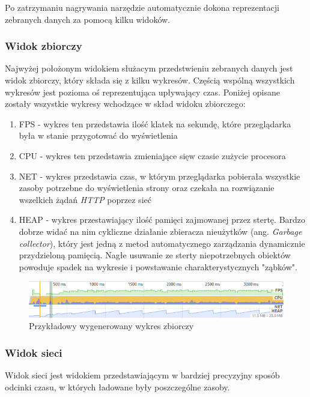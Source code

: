 \documentclass[polish, twoside, 12pt]{mwart}
\begin{document}
Po zatrzymaniu nagrywania narzędzie automatycznie dokona reprezentacji zebranych danych za pomocą kilku widoków.

\subsubsection{Widok zbiorczy}

Najwyżej położonym widokiem służacym przedstwieniu zebranych danych jest widok zbiorczy, który składa się z kilku wykresów. Częścią wspólną wszystkich wykresów jest pozioma oś reprezentująca upływający czas. Poniżej opisane zostały wszystkie wykresy wchodzące w skład widoku zbiorczego:

\begin{enumerate}
  \item FPS - wykres ten przedstawia ilość klatek na sekundę, które przeglądarka była w stanie przygotować do wyświetlenia
  \item CPU - wykres ten przedstawia zmieniające sięw  czasie zużycie procesora
  \item NET - wykres przedstawia czas, w którym przeglądarka pobierała wszystkie zasoby potrzebne do wyświetlenia strony oraz czekała na rozwiązanie wszelkich żądań \emph{HTTP} poprzez sieć
  \item HEAP - wykres przestawiający ilość pamięci zajmowanej przez stertę. Bardzo dobrze widać na nim cykliczne działanie zbieracza nieużytków (ang. \emph{Garbage collector}), który jest jedną z metod automatycznego zarządzania dynamicznie przydzieloną pamięcią. Nagłe usuwanie ze sterty niepotrzebnych obiektów powoduje spadek na wykresie i powstawanie charakterystycznych "ząbków".
\end{enumerate}

\begin{figure}[ht]
  \includegraphics[width=\textwidth]{chrome-devtools-performance-summary-view.png}
	\caption{Przykładowy wygenerowany wykres zbiorczy}
\end{figure}

\subsubsection{Widok sieci}

Widok sieci jest widokiem przedstawiającym w bardziej precyzyjny sposób odcinki czasu, w których ładowane były poszczególne zasoby.
\end{document}

